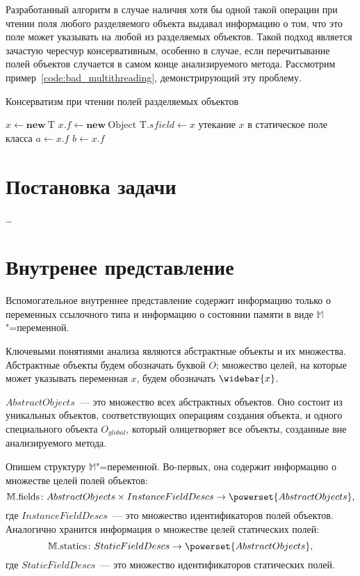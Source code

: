 \documentclass[14pt,titlepage,draft]{extarticle}
\newcommand{\M}{\ensuremath{\mathbb{M}}}
\newcommand{\Mfield}[1]{\ensuremath{\mathrm{#1}}}
\newcommand{\type}[1]{\mathrm{#1}}
\newcommand{\op}[1]{\mathbf{#1}}
\newcommand{\pts}[1]{\widebar{#1}}
\begin{document}
      Разработанный алгоритм в случае наличия хотя бы одной такой операции при
      чтении поля любого разделяемого объекта выдавал информацию о том, что это
      поле может указывать на любой из разделяемых объектов. Такой подход
      является зачастую чересчур консервативным, особенно в случае, если
      перечитывание полей объектов случается в самом конце анализируемого
      метода. Рассмотрим пример~\ref{code:bad_multithreading}, демонстрирующий
      эту проблему.
      
      \begin{algorithm}
        \caption{Консерватизм при чтении полей разделяемых объектов}
        \label{code:bad_multithreading}
        \begin{algorithmic}[1]
          \State $x \gets \op{new}~\type{T}$
          \State $x.f \gets \op{new}~\type{Object}$
          \State $\type{T}.sfield \gets x$
            \Comment утекание $x$ в статическое поле класса
          \State $a \gets x.f$
          \State {}
          \State $b \gets x.f$
        \end{algorithmic}
      \end{algorithm}


  \section{Постановка задачи}

    \ldots

  \section{Внутренее представление}

    Вспомогательное внутреннее представление содержит информацию только о
    переменных ссылочного типа и информацию о состоянии памяти в виде
    \M"=переменной.

    Ключевыми понятиями анализа являются абстрактные объекты и их множества.
    Абстрактные объекты будем обозначать буквой $O$; множество целей, на
    которые может указывать переменная $x$, будем обозначать $\pts{x}$.

    $AbstractObjects$~--- это множество всех абстрактных объектов. Оно
    состоит из уникальных объектов, соответствующих операциям создания объекта,
    и одного специального объекта $O_{global}$, который олицетворяет все
    объекты, созданные вне анализируемого метода.

    Опишем структуру \M"=переменной. Во-первых, она содержит информацию о
    множестве целей полей объектов:
    \[ \M.\Mfield{fields}\colon
      AbstractObjects \times InstanceFieldDescs \to
      \powerset{AbstractObjects},
    \]
    где $InstanceFieldDescs$~--- это множество идентификаторов полей объектов.
    Аналогично хранится информация о множестве целей статических полей:
    \[ \M.\Mfield{statics}\colon
      StaticFieldDescs \to \powerset{AbstractObjects},
    \]
    где $StaticFieldDescs$~--- это множество идентификаторов
    статических полей.
\end{document}

